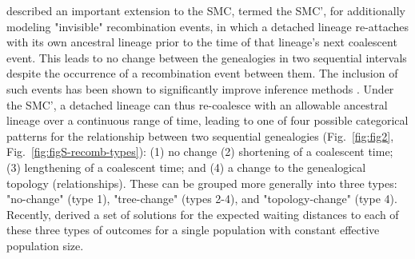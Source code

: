 \documentclass[11pt]{article}
\begin{document}
\cite{marjoram2006fast}
described an important extension to the SMC, termed the SMC', for additionally
modeling "invisible" recombination events, in which a detached lineage re-attaches
with its own ancestral lineage prior to the time of that lineage's next coalescent event. 
This leads to no change between the genealogies in two sequential intervals
despite the occurrence of a recombination event between them. The inclusion of
such events has been shown to 
significantly improve inference methods \citep{wilton2015smc}. 
Under the SMC', a detached lineage can thus re-coalesce with an allowable 
ancestral lineage over a continuous range of time, leading to one of 
four possible categorical patterns for the relationship between two
sequential genealogies
(Fig.~\ref{fig:fig2}, Fig.~\ref{fig:figS-recomb-types}): 
(1) no change %
(2) shortening of a coalescent time; (3) lengthening of a coalescent time; 
and (4) %
a change to the genealogical topology (relationships).
These can be grouped more generally into three types: 
"no-change" (type 1), "tree-change" (types 2-4), and "topology-change"
(type 4). Recently, \citet{deng_distribution_2021} derived a set of solutions for
the expected waiting distances to each of these three types of 
outcomes for a single population with constant effective population size.
\end{document}
